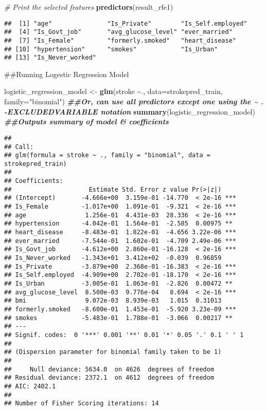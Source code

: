 \documentclass[
]{article}
\newenvironment{Shaded}{\begin{snugshade}}{\end{snugshade}}
\newcommand{\AttributeTok}[1]{\textcolor[rgb]{0.13,0.29,0.53}{#1}}
\newcommand{\CommentTok}[1]{\textcolor[rgb]{0.56,0.35,0.01}{\textit{#1}}}
\newcommand{\DocumentationTok}[1]{\textcolor[rgb]{0.56,0.35,0.01}{\textbf{\textit{#1}}}}
\newcommand{\FunctionTok}[1]{\textcolor[rgb]{0.13,0.29,0.53}{\textbf{#1}}}
\newcommand{\NormalTok}[1]{#1}
\newcommand{\OtherTok}[1]{\textcolor[rgb]{0.56,0.35,0.01}{#1}}
\newcommand{\SpecialCharTok}[1]{\textcolor[rgb]{0.81,0.36,0.00}{\textbf{#1}}}
\newcommand{\StringTok}[1]{\textcolor[rgb]{0.31,0.60,0.02}{#1}}
\begin{document}
\begin{Shaded}
\begin{Highlighting}[]
\CommentTok{\# Print the selected features}
\FunctionTok{predictors}\NormalTok{(result\_rfe1)}
\end{Highlighting}
\end{Shaded}

\begin{verbatim}
##  [1] "age"               "Is_Private"        "Is_Self.employed" 
##  [4] "Is_Govt_job"       "avg_glucose_level" "ever_married"     
##  [7] "Is_Female"         "formerly.smoked"   "heart_disease"    
## [10] "hypertension"      "smokes"            "Is_Urban"         
## [13] "Is_Never_worked"
\end{verbatim}

\#\#Running Logestic Regression Model

\begin{Shaded}
\begin{Highlighting}[]
\NormalTok{logistic\_regression\_model }\OtherTok{\textless{}{-}} \FunctionTok{glm}\NormalTok{(stroke }\SpecialCharTok{\textasciitilde{}}\NormalTok{., }\AttributeTok{data=}\NormalTok{strokepred\_train, }\AttributeTok{family=}\StringTok{"binomial"}\NormalTok{) }\DocumentationTok{\#\#Or, can use all predictors except one using the \textasciitilde{} . {-}EXCLUDEDVARIABLE notation}
\FunctionTok{summary}\NormalTok{(logistic\_regression\_model) }\DocumentationTok{\#\#Outputs summary of model \& coefficients}
\end{Highlighting}
\end{Shaded}

\begin{verbatim}
## 
## Call:
## glm(formula = stroke ~ ., family = "binomial", data = strokepred_train)
## 
## Coefficients:
##                     Estimate Std. Error z value Pr(>|z|)    
## (Intercept)       -4.666e+00  3.159e-01 -14.770  < 2e-16 ***
## Is_Female         -1.017e+00  1.091e-01  -9.321  < 2e-16 ***
## age                1.256e-01  4.431e-03  28.336  < 2e-16 ***
## hypertension      -4.042e-01  1.564e-01  -2.585  0.00975 ** 
## heart_disease     -8.483e-01  1.822e-01  -4.656 3.22e-06 ***
## ever_married      -7.544e-01  1.602e-01  -4.709 2.49e-06 ***
## Is_Govt_job       -4.612e+00  2.860e-01 -16.128  < 2e-16 ***
## Is_Never_worked   -1.343e+01  3.412e+02  -0.039  0.96859    
## Is_Private        -3.879e+00  2.368e-01 -16.383  < 2e-16 ***
## Is_Self.employed  -4.909e+00  2.702e-01 -18.170  < 2e-16 ***
## Is_Urban          -3.005e-01  1.063e-01  -2.826  0.00472 ** 
## avg_glucose_level  8.500e-03  9.776e-04   8.694  < 2e-16 ***
## bmi                9.072e-03  8.939e-03   1.015  0.31013    
## formerly.smoked   -8.600e-01  1.453e-01  -5.920 3.23e-09 ***
## smokes            -5.483e-01  1.788e-01  -3.066  0.00217 ** 
## ---
## Signif. codes:  0 '***' 0.001 '**' 0.01 '*' 0.05 '.' 0.1 ' ' 1
## 
## (Dispersion parameter for binomial family taken to be 1)
## 
##     Null deviance: 5634.0  on 4626  degrees of freedom
## Residual deviance: 2372.1  on 4612  degrees of freedom
## AIC: 2402.1
## 
## Number of Fisher Scoring iterations: 14
\end{verbatim}
\end{document}
